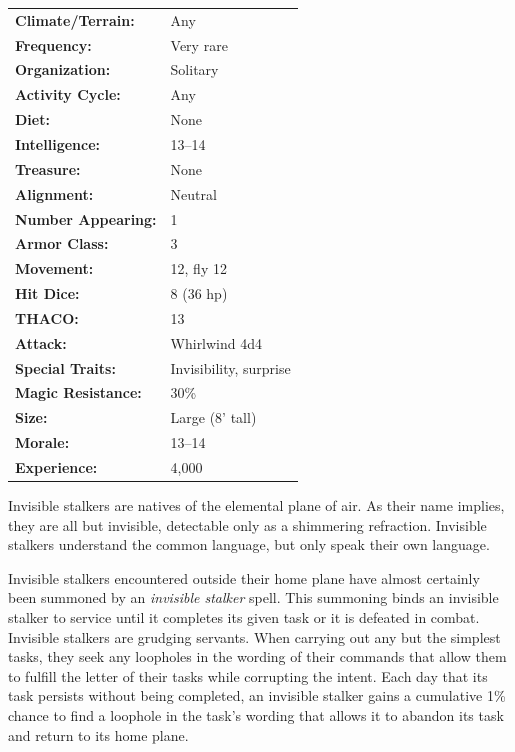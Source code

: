 \begin{multicols}{2}
\begin{minipage}{\columnwidth}
\noindent \begin{tabular}{p{}p{}}
\textbf{Climate/Terrain:}	& Any	\\
\textbf{Frequency:} 		& Very rare	\\
\textbf{Organization:} 		& Solitary	\\
\textbf{Activity Cycle:} 	& Any	\\
\textbf{Diet:} 				& None	\\
\textbf{Intelligence:} 		& 13--14	\\
\textbf{Treasure:} 			& None	\\
\textbf{Alignment:} 		& Neutral	\\
\hline
\textbf{Number Appearing:} 	& 1	\\
\textbf{Armor Class:} 		& 3	\\
\textbf{Movement:} 			& 12, fly 12	\\
\textbf{Hit Dice:} 			& 8	(36 hp)	\\
\textbf{THACO:} 			& 13	\\
\textbf{Attack:} 			& Whirlwind 4d4	\\
\textbf{Special Traits:} & Invisibility, surprise	\\
\textbf{Magic Resistance:} 	& 30\%	\\
\textbf{Size:} 				& Large (8' tall)	\\
\textbf{Morale:} 			& 13--14	\\
\textbf{Experience:} 		& 4,000	\\ %
\end{tabular}

\end{minipage}

Invisible stalkers are natives of the elemental plane of air. As their name implies, they are all but invisible, detectable only as a shimmering refraction. Invisible stalkers understand the common language, but only speak their own language.

Invisible stalkers encountered outside their home plane have almost certainly been summoned by an \textit{invisible stalker} spell. This summoning binds an invisible stalker to service until it completes its given task or it is defeated in combat. Invisible stalkers are grudging servants. When carrying out any but the simplest tasks, they seek any loopholes in the wording of their commands that allow them to fulfill the letter of their tasks while corrupting the intent. Each day that its task persists without being completed, an invisible stalker gains a cumulative 1\% chance to find a loophole in the task's wording that allows it to abandon its task and return to its home plane.


\end{multicols}
